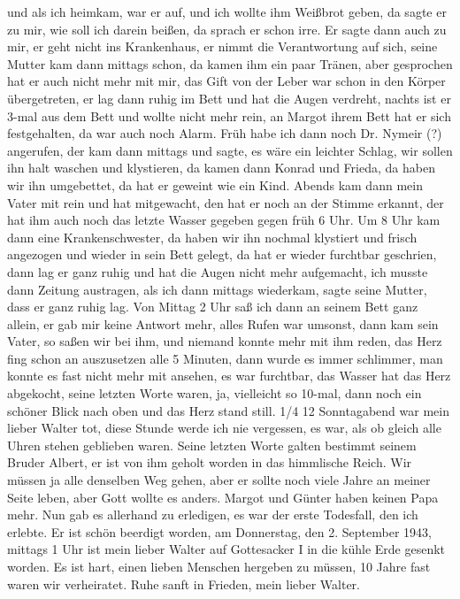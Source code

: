 \documentclass[a5paper,11pt,openany]{book}
\newcommand{\seite}[1]{\leavevmode\marginpar{\footnotesize\itshape\raggedright #1}\ignorespaces}
\begin{document}
  und als ich heimkam, war er auf, und ich wollte ihm Weißbrot geben,
  da sagte er zu mir, wie soll ich darein beißen, da sprach er schon irre.
Er sagte dann auch zu mir, er geht nicht ins Krankenhaus, er nimmt die Verantwortung auf sich,
  seine Mutter kam dann mittags schon, da kamen ihm ein paar Tränen,
  aber gesprochen hat er auch nicht mehr mit mir, das Gift von der Leber war schon
\seite{64}
in den Körper übergetreten, er lag dann ruhig im Bett und hat die Augen verdreht,
  nachts ist er 3-mal aus dem Bett und wollte nicht mehr rein,
  an Margot ihrem Bett hat er sich festgehalten, da war auch noch Alarm.
Früh habe ich dann noch Dr. Nymeir (?) angerufen, der kam dann mittags und sagte, es wäre ein leichter Schlag,
  wir sollen ihn halt waschen und klystieren,
  da kamen dann Konrad und Frieda, da haben wir ihn umgebettet, da hat er geweint
\seite{65}
wie ein Kind.
Abends kam dann mein Vater mit rein und hat mitgewacht, den hat er noch an der Stimme erkannt,
  der hat ihm auch noch das letzte Wasser gegeben gegen früh 6 Uhr.
Um 8 Uhr kam dann eine Krankenschwester,
  da haben wir ihn nochmal klystiert und frisch angezogen und wieder in sein Bett gelegt,
  da hat er wieder furchtbar geschrien, dann lag er ganz ruhig und hat die Augen nicht mehr aufgemacht,
\seite{66}
ich musste dann Zeitung austragen, als ich dann mittags wiederkam, sagte seine Mutter, dass er ganz ruhig lag.
Von Mittag 2 Uhr saß ich dann an seinem Bett ganz allein, er gab mir keine Antwort mehr,
  alles Rufen war umsonst, dann kam sein Vater, so saßen wir bei ihm, und niemand konnte mehr mit ihm reden,
  das Herz fing schon an auszusetzen alle 5 Minuten, dann wurde es immer schlimmer, man konnte es fast nicht mehr
\seite{67}
mit ansehen, es war furchtbar,
  das Wasser hat das Herz abgekocht, seine letzten Worte waren, ja, vielleicht so 10-mal,
  dann noch ein schöner Blick nach oben und das Herz stand still.
1/4 12 Sonntagabend war mein lieber Walter tot, diese Stunde werde ich nie vergessen,
  es war, als ob gleich alle Uhren stehen geblieben waren.
Seine letzten Worte galten bestimmt seinem Bruder Albert, er ist von ihm geholt worden in das himmlische Reich.
Wir müssen ja alle
\seite{68}
denselben Weg gehen, aber er sollte noch viele Jahre an meiner Seite leben, aber Gott wollte es anders.
Margot und Günter haben keinen Papa mehr.
Nun gab es allerhand zu erledigen,
  es war der erste Todesfall, den ich erlebte.
Er ist schön beerdigt worden, am Donnerstag, den 2. September 1943, mittags 1 Uhr
  ist mein lieber Walter auf Gottesacker I in die kühle Erde gesenkt worden.
Es ist hart, einen lieben Menschen hergeben zu müssen, 10 Jahre fast waren wir verheiratet.
Ruhe sanft in Frieden, mein lieber Walter.
\end{document}
